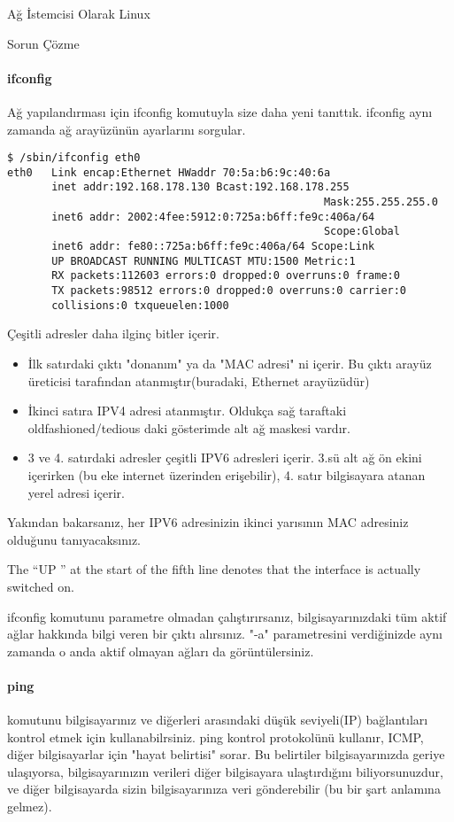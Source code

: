 \begin{section}{Ağ İstemcisi Olarak Linux}
\begin{subsection}{Sorun Çözme}
\paragraph{ifconfig}{ Ağ yapılandırması için ifconfig komutuyla size daha yeni tanıttık. ifconfig aynı zamanda ağ arayüzünün ayarlarını sorgular.}
\begin{verbatim}
$ /sbin/ifconfig eth0
eth0   Link encap:Ethernet HWaddr 70:5a:b6:9c:40:6a
       inet addr:192.168.178.130 Bcast:192.168.178.255 
                                                  Mask:255.255.255.0
       inet6 addr: 2002:4fee:5912:0:725a:b6ff:fe9c:406a/64
                                                  Scope:Global
       inet6 addr: fe80::725a:b6ff:fe9c:406a/64 Scope:Link
       UP BROADCAST RUNNING MULTICAST MTU:1500 Metric:1
       RX packets:112603 errors:0 dropped:0 overruns:0 frame:0
       TX packets:98512 errors:0 dropped:0 overruns:0 carrier:0
       collisions:0 txqueuelen:1000
\end{verbatim}

Çeşitli adresler daha ilginç bitler içerir.

\begin{itemize}
\item İlk satırdaki çıktı "donanım" ya da "MAC adresi" ni içerir. Bu çıktı arayüz üreticisi tarafından atanmıştır(buradaki, Ethernet arayüzüdür)
\item İkinci satıra IPV4 adresi atanmıştır. Oldukça sağ taraftaki oldfashioned/tedious daki gösterimde alt ağ maskesi vardır. 
\item 3 ve 4. satırdaki adresler çeşitli IPV6 adresleri içerir. 3.sü alt ağ ön  ekini içerirken (bu eke internet üzerinden erişebilir), 4. satır bilgisayara atanan yerel adresi içerir.
\end{itemize}

Yakından bakarsanız, her IPV6 adresinizin ikinci yarısının MAC adresiniz olduğunu tanıyacaksınız.

The “UP ” at the start of the fifth line denotes that the interface is actually switched on.

ifconfig komutunu parametre olmadan çalıştırırsanız, bilgisayarınızdaki tüm aktif ağlar hakkında bilgi veren bir çıktı alırsınız. "-a" parametresini verdiğinizde aynı zamanda o anda aktif olmayan ağları da görüntülersiniz.

\paragraph{ping}{komutunu bilgisayarınız ve diğerleri arasındaki düşük seviyeli(IP) bağlantıları kontrol etmek için kullanabilrsiniz. ping kontrol protokolünü kullanır, ICMP, diğer bilgisayarlar için "hayat belirtisi" sorar. Bu belirtiler bilgisayarınızda geriye ulaşıyorsa, bilgisayarınızın verileri diğer bilgisayara ulaştırdığını biliyorsunuzdur, ve diğer bilgisayarda sizin bilgisayarınıza veri gönderebilir (bu bir şart anlamına gelmez).}


\end{subsection}
\end{section}
